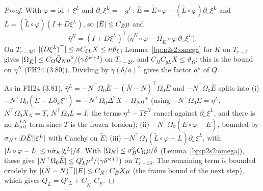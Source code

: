 \begin{proof}
\label{step:p2s2:st-e}
With $\varphi=\mathrm{id}+\xi^L$ and $\partial_\omega\xi^L=-g^L$: $\bar E=\tilde E\circ\varphi-(\tilde L\circ\varphi)\partial_\omega\xi^L$ and $\bar L=(\tilde L\circ\varphi)(I+D\xi^L)$, so
$\lvert \bar E\rvert\le C_{\bar E}\mu$ and
\[
\bar\eta^N=(I+D\xi^L)^\top\bigl(\tilde\eta^N\circ\varphi-\Omega_{\tilde K}\circ\varphi\,\partial_\omega\xi^L\bigr).
\]
On $T_{r-3\delta}$: $\lvert (D\xi^L)^\top\rvert\le nC_{\xi L}X\le n\vartheta_\xi$; Lemma~\ref{bp:p2s2:omega} for $\tilde K$ on $T_{r-\delta}$ gives $\lvert \Omega_{\tilde K}\rvert\le C_\Omega\tilde Q_N\mu^2/(\gamma\delta^{\varkappa+2})$
on $T_{r-2\delta}$, and $C_\Omega C_{gL}X\le\vartheta_\Omega$; this is the bound on $\bar\eta^N$ (FH24 (3.80)). Dividing by $\gamma(\delta/a)^\varkappa$ gives the factor $a^\varkappa$ of $Q$.

\label{step:p2s2:st-etal}
As in FH24 (3.81), $\bar\eta^L=-N^\top\Omega_0\bar E-(\bar N-N)^\top\Omega_0\bar E$ and $-N^\top\Omega_0\bar E$ splits into
(i) $-N^\top\Omega_0(\tilde E-L\partial_\omega\xi^L)=-N^\top\Omega_0\Delta^2X-\Omega_N\eta^N$ (using $-N^\top\Omega_0E=\eta^L$, $N^\top\Omega_0X_N=T$, $N^\top\Omega_0L=I$; the terms
$\eta^L-T\xi^N$ cancel against $\partial_\omega\xi^L$, and there is no $E^{LN}_{\mathrm{red}}$ term since $T$ is the frozen torsion);
(ii) $-N^\top\Omega_0(\tilde E\circ\varphi-\tilde E)$, bounded by $\sigma_{N^\top}\lvert D\tilde E\rvert\lvert \xi^L\rvert$ with Cauchy on $\tilde E$;
(iii) $-N^\top\Omega_0(\tilde L\circ\varphi-L)\partial_\omega\xi^L$, with $\lvert \tilde L\circ\varphi-\tilde L\rvert\le n\tilde\sigma_K\lvert \xi^L\rvert/\delta$. With
$\lvert \Omega_N\rvert\le\sigma_B^2C_\Omega\mu/\delta$ (Lemma~\ref{bp:p2s2:omega}), these give $\lvert N^\top\Omega_0\bar E\rvert\le Q'_L\mu^2/(\gamma\delta^{\varkappa+1})$ on $T_{r-3\delta}$. The remaining
term is bounded crudely by $\lvert (\bar N-N)^\top\rvert\lvert \bar E\rvert\le C_{\bar N^\top}C_{\bar E}X\mu$ (the frame bound of the next step), which gives $Q_L=Q'_L+C_{\bar N^\top}C_{\bar E}$.


\end{proof}
